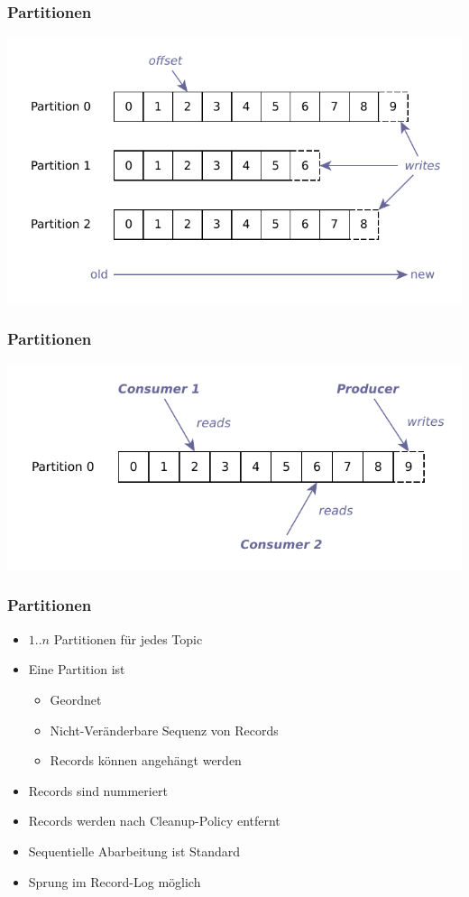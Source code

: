 \begin{frame}
\frametitle{Partitionen}
	\centering
	\includegraphics[scale=0.75]{figure/partitioned_log.pdf}
\end{frame}

\begin{frame}
\frametitle{Partitionen}
\centering
\includegraphics[scale=0.75]{figure/partition.pdf}
\end{frame}

\begin{frame}
\frametitle{Partitionen}
\begin{itemize}
	\item $1..n$ Partitionen für jedes Topic
	\item Eine Partition ist
	\begin{itemize}
		\item Geordnet
		\item Nicht-Veränderbare Sequenz von Records
		\item Records können angehängt werden
	\end{itemize}
	\item Records sind nummeriert
	\item Records werden nach Cleanup-Policy entfernt
	\item Sequentielle Abarbeitung ist Standard
	\item Sprung im Record-Log möglich
\end{itemize}
\end{frame}

